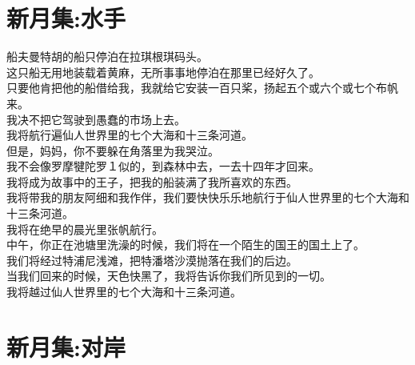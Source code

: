 \documentclass[]{book}
\renewenvironment{quote}{\begin{VF}}{\end{VF}}
\begin{document}
\section{新月集:水手}

\begin{quote}
船夫曼特胡的船只停泊在拉琪根琪码头。\\
这只船无用地装载着黄麻，无所事事地停泊在那里已经好久了。\\
只要他肯把他的船借给我，我就给它安装一百只桨，扬起五个或六个或七个布帆来。\\
我决不把它驾驶到愚蠢的市场上去。\\
我将航行遍仙人世界里的七个大海和十三条河道。\\
但是，妈妈，你不要躲在角落里为我哭泣。\\
我不会像罗摩犍陀罗１似的，到森林中去，一去十四年才回来。\\
我将成为故事中的王子，把我的船装满了我所喜欢的东西。\\
我将带我的朋友阿细和我作伴，我们要快快乐乐地航行于仙人世界里的七个大海和十三条河道。\\
我将在绝早的晨光里张帆航行。\\
中午，你正在池塘里洗澡的时候，我们将在一个陌生的国王的国土上了。\\
我们将经过特浦尼浅滩，把特潘塔沙漠抛落在我们的后边。\\
当我们回来的时候，天色快黑了，我将告诉你我们所见到的一切。\\
我将越过仙人世界里的七个大海和十三条河道。
\end{quote}

\section{新月集:对岸}
\end{document}
